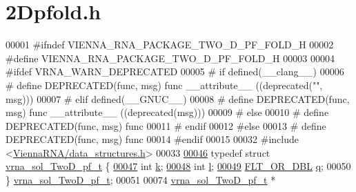 \hypertarget{2Dpfold_8h_source}{}\section{2\+Dpfold.h}
\label{2Dpfold_8h_source}

\begin{DoxyCode}
00001 \textcolor{preprocessor}{#ifndef VIENNA\_RNA\_PACKAGE\_TWO\_D\_PF\_FOLD\_H}
00002 \textcolor{preprocessor}{#define VIENNA\_RNA\_PACKAGE\_TWO\_D\_PF\_FOLD\_H}
00003 
00004 \textcolor{preprocessor}{#ifdef VRNA\_WARN\_DEPRECATED}
00005 \textcolor{preprocessor}{# if defined(\_\_clang\_\_)}
00006 \textcolor{preprocessor}{#  define DEPRECATED(func, msg) func \_\_attribute\_\_ ((deprecated("", msg)))}
00007 \textcolor{preprocessor}{# elif defined(\_\_GNUC\_\_)}
00008 \textcolor{preprocessor}{#  define DEPRECATED(func, msg) func \_\_attribute\_\_ ((deprecated(msg)))}
00009 \textcolor{preprocessor}{# else}
00010 \textcolor{preprocessor}{#  define DEPRECATED(func, msg) func}
00011 \textcolor{preprocessor}{# endif}
00012 \textcolor{preprocessor}{#else}
00013 \textcolor{preprocessor}{# define DEPRECATED(func, msg) func}
00014 \textcolor{preprocessor}{#endif}
00015 
00032 \textcolor{preprocessor}{#include <\hyperlink{data__structures_8h}{ViennaRNA/data\_structures.h}>}
00033 
\hyperlink{group__kl__neighborhood__pf}{00046} \textcolor{keyword}{typedef} \textcolor{keyword}{struct }\hyperlink{group__kl__neighborhood__pf_structvrna__sol__TwoD__pf__t}{vrna\_sol\_TwoD\_pf\_t} \{
\hyperlink{group__kl__neighborhood__pf_ad1f23b46dc4ebd373abdeb0382d87b83}{00047}   \textcolor{keywordtype}{int}         \hyperlink{group__kl__neighborhood__pf_ad1f23b46dc4ebd373abdeb0382d87b83}{k};  
\hyperlink{group__kl__neighborhood__pf_a01133c264eff2c988d144e07803d1b8b}{00048}   \textcolor{keywordtype}{int}         \hyperlink{group__kl__neighborhood__pf_a01133c264eff2c988d144e07803d1b8b}{l};  
\hyperlink{group__kl__neighborhood__pf_a17ebbf425b8769ded74b5c7b85e58ee1}{00049}   \hyperlink{group__data__structures_ga31125aeace516926bf7f251f759b6126}{FLT\_OR\_DBL}  \hyperlink{group__kl__neighborhood__pf_a17ebbf425b8769ded74b5c7b85e58ee1}{q};  
00050 \} \hyperlink{group__kl__neighborhood__pf_ga5e449fbd695406aabd2bcabddc374621}{vrna\_sol\_TwoD\_pf\_t};
00051 
00074 \hyperlink{group__kl__neighborhood__pf_structvrna__sol__TwoD__pf__t}{vrna\_sol\_TwoD\_pf\_t} *

\end{DoxyCode}
